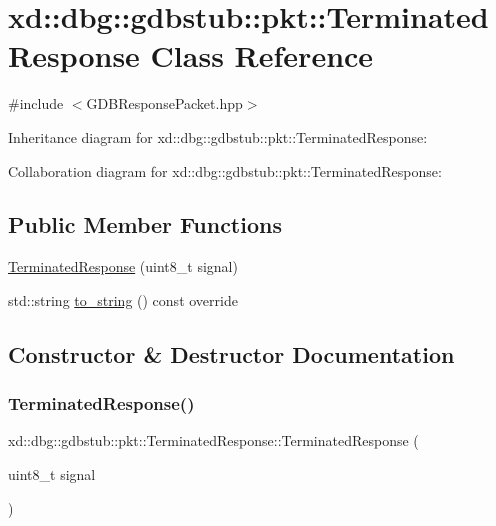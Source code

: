 \hypertarget{classxd_1_1dbg_1_1gdbstub_1_1pkt_1_1_terminated_response}{}\section{xd\+:\+:dbg\+:\+:gdbstub\+:\+:pkt\+:\+:Terminated\+Response Class Reference}
\label{classxd_1_1dbg_1_1gdbstub_1_1pkt_1_1_terminated_response}


{\ttfamily \#include $<$G\+D\+B\+Response\+Packet.\+hpp$>$}



Inheritance diagram for xd\+:\+:dbg\+:\+:gdbstub\+:\+:pkt\+:\+:Terminated\+Response\+:


Collaboration diagram for xd\+:\+:dbg\+:\+:gdbstub\+:\+:pkt\+:\+:Terminated\+Response\+:
\subsection*{Public Member Functions}
\begin{DoxyCompactItemize}
\item 
\mbox{\hyperlink{classxd_1_1dbg_1_1gdbstub_1_1pkt_1_1_terminated_response_a1e075b3fc61ee2be105abcd4f57a94ab}{Terminated\+Response}} (uint8\+\_\+t signal)
\item 
std\+::string \mbox{\hyperlink{classxd_1_1dbg_1_1gdbstub_1_1pkt_1_1_terminated_response_abf937638e57e626785942dd18b6160a9}{to\+\_\+string}} () const override
\end{DoxyCompactItemize}


\subsection{Constructor \& Destructor Documentation}
\mbox{\label{classxd_1_1dbg_1_1gdbstub_1_1pkt_1_1_terminated_response_a1e075b3fc61ee2be105abcd4f57a94ab}} 
\subsubsection{\texorpdfstring{Terminated\+Response()}{TerminatedResponse()}}
{\footnotesize\ttfamily xd\+::dbg\+::gdbstub\+::pkt\+::\+Terminated\+Response\+::\+Terminated\+Response (\begin{DoxyParamCaption}\item[{uint8\+\_\+t}]{signal }\end{DoxyParamCaption})\hspace{0.3cm}{\ttfamily [inline]}}



